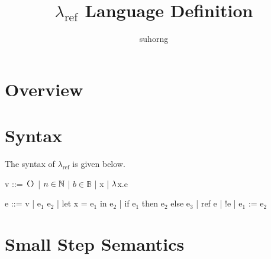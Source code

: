 \documentclass{article}
\begin{document}
\title{$\lambda_\text{ref}$ Language Definition}
\author{suhorng}
\maketitle
\section{Overview}
\section{Syntax}
The syntax of $\lambda_\text{ref}$ is given below.

\begin{minipage}{\textwidth}
\begin{minipage}[t]{0.45\textwidth}
\begin{code}
v  ::=  $\text{\texttt{()}}$
     |    $n\in \mathbb N$
     |    $b\in \mathbb{B}$
     |    x
     |    $\lambda$x.e
\end{code}

\end{minipage}
\begin{minipage}[t]{0.45\textwidth}

\begin{code}
e  ::=  v
     |   e$_1$ e$_2$
     |   let x = e$_1$ in e$_2$
     |   if e$_1$ then e$_2$ else e$_3$
     |   ref e
     |   !e
     |   e$_1$ := e$_2$
\end{code}
\end{minipage}
\end{minipage}

\section{Small Step Semantics}
\end{document}
